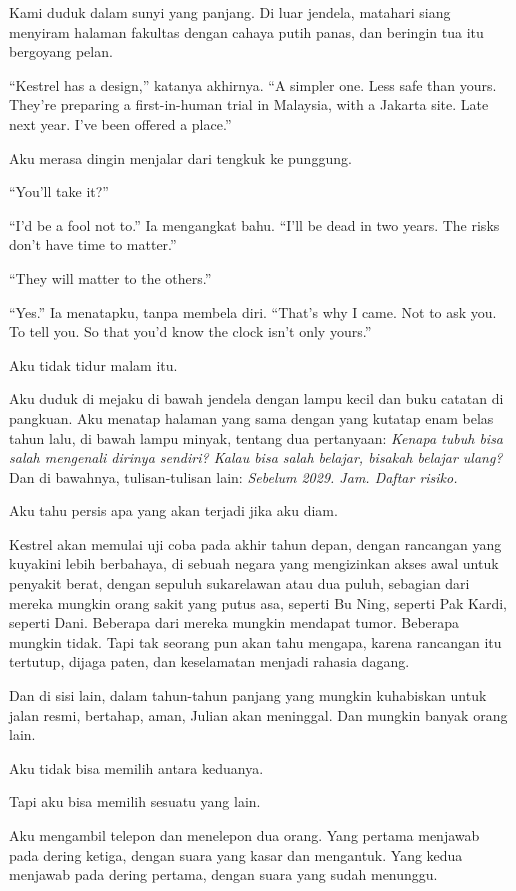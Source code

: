 \documentclass[11pt,twoside,openany]{book}
\makeatletter
\newcommand{\scenebreak}{\par\vspace{0.9em}{\centering\textsc{*\hspace{0.7em}*\hspace{0.7em}*}\par}\vspace{0.9em}\@afterindentfalse\@afterheading}
\makeatother
\begin{document}
Kami duduk dalam sunyi yang panjang. Di luar jendela, matahari siang menyiram halaman fakultas dengan cahaya putih panas, dan beringin tua itu bergoyang pelan.

``Kestrel has a design,'' katanya akhirnya. ``A simpler one. Less safe than yours. They're preparing a first-in-human trial in Malaysia, with a Jakarta site. Late next year. I've been offered a place.''

Aku merasa dingin menjalar dari tengkuk ke punggung.

``You'll take it?''

``I'd be a fool not to.'' Ia mengangkat bahu. ``I'll be dead in two years. The risks don't have time to matter.''

``They will matter to the others.''

``Yes.'' Ia menatapku, tanpa membela diri. ``That's why I came. Not to ask you. To tell you. So that you'd know the clock isn't only yours.''

\scenebreak
Aku tidak tidur malam itu.

Aku duduk di mejaku di bawah jendela dengan lampu kecil dan buku catatan di pangkuan. Aku menatap halaman yang sama dengan yang kutatap enam belas tahun lalu, di bawah lampu minyak, tentang dua pertanyaan: \emph{Kenapa tubuh bisa salah mengenali dirinya sendiri? Kalau bisa salah belajar, bisakah belajar ulang?} Dan di bawahnya, tulisan-tulisan lain: \emph{Sebelum 2029. Jam. Daftar risiko.}

Aku tahu persis apa yang akan terjadi jika aku diam.

Kestrel akan memulai uji coba pada akhir tahun depan, dengan rancangan yang kuyakini lebih berbahaya, di sebuah negara yang mengizinkan akses awal untuk penyakit berat, dengan sepuluh sukarelawan atau dua puluh, sebagian dari mereka mungkin orang sakit yang putus asa, seperti Bu Ning, seperti Pak Kardi, seperti Dani. Beberapa dari mereka mungkin mendapat tumor. Beberapa mungkin tidak. Tapi tak seorang pun akan tahu mengapa, karena rancangan itu tertutup, dijaga paten, dan keselamatan menjadi rahasia dagang.

Dan di sisi lain, dalam tahun-tahun panjang yang mungkin kuhabiskan untuk jalan resmi, bertahap, aman, Julian akan meninggal. Dan mungkin banyak orang lain.

Aku tidak bisa memilih antara keduanya.

Tapi aku bisa memilih sesuatu yang lain.

Aku mengambil telepon dan menelepon dua orang. Yang pertama menjawab pada dering ketiga, dengan suara yang kasar dan mengantuk. Yang kedua menjawab pada dering pertama, dengan suara yang sudah menunggu.
\end{document}
